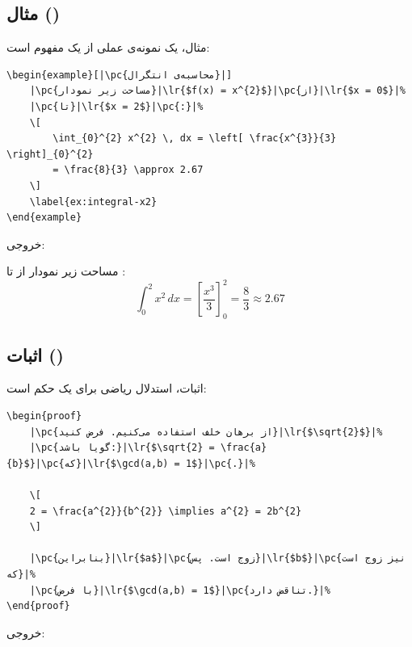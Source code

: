 \subsection{مثال ()}
\label{sec:environments-example}

مثال، یک نمونه‌ی عملی از یک مفهوم است:

\begin{latin}
\begin{verbatim}
\begin{example}[|\pc{محاسبه‌ی انتگرال}|]
    |\pc{مساحت زیر نمودار}|\lr{$f(x) = x^{2}$}|\pc{از}|\lr{$x = 0$}|%
    |\pc{تا}|\lr{$x = 2$}|\pc{:}|%
    \[
        \int_{0}^{2} x^{2} \, dx = \left[ \frac{x^{3}}{3} \right]_{0}^{2}
        = \frac{8}{3} \approx 2.67
    \]
    \label{ex:integral-x2}
\end{example}
\end{verbatim}
\end{latin}

خروجی:

\begin{example}
    مساحت زیر نمودار  از
     تا :
    \[
        \int_{0}^{2} x^{2} \, dx = \left[ \frac{x^{3}}{3} \right]_{0}^{2}
        = \frac{8}{3} \approx 2.67
    \]
    \label{ex:integral-x2-ch8}
\end{example}

\subsection{اثبات ()}
\label{sec:environments-proof}

اثبات، استدلال ریاضی برای یک حکم است:

\begin{latin}
\begin{verbatim}
\begin{proof}
    |\pc{از برهان خلف استفاده می‌کنیم. فرض کنید}|\lr{$\sqrt{2}$}|%
    |\pc{گویا باشد:}|\lr{$\sqrt{2} = \frac{a}{b}$}|\pc{که}|\lr{$\gcd(a,b) = 1$}|\pc{.}|%

    \[
    2 = \frac{a^{2}}{b^{2}} \implies a^{2} = 2b^{2}
    \]

    |\pc{بنابراین}|\lr{$a$}|\pc{زوج است. پس}|\lr{$b$}|\pc{نیز زوج است که}|%
    |\pc{با فرض}|\lr{$\gcd(a,b) = 1$}|\pc{تناقض دارد.}|%
\end{proof}
\end{verbatim}
\end{latin}

خروجی:


